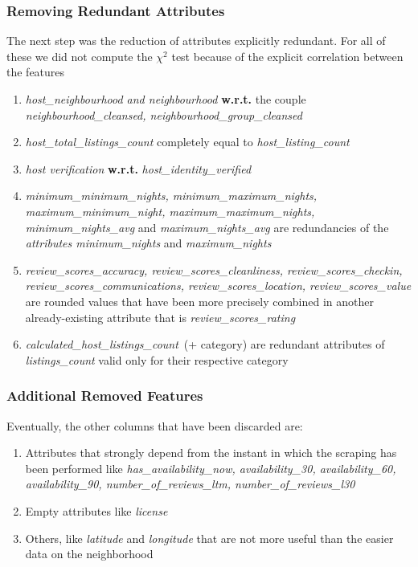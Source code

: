 \subsubsection{Removing Redundant Attributes}
The next step was the reduction of attributes explicitly redundant. For all of these we did not compute the $\chi^2$ test because of the explicit correlation between the features

\begin{enumerate}
	\item \textit{host\_neighbourhood and neighbourhood} \textbf{w.r.t.} the couple \textit{neighbourhood\_cleansed, neighbourhood\_group\_cleansed}
	\item \textit{host\_total\_listings\_count} completely equal to \textit{host\_listing\_count}
	\item \textit{host verification} \textbf{w.r.t.} \textit{host\_identity\_verified}
	\item \textit{minimum\_minimum\_nights, minimum\_maximum\_nights, maximum\_minimum\_night, maximum\_maximum\_nights, minimum\_nights\_avg} and \textit{maximum\_nights\_avg} are redundancies of the \textit{attributes minimum\_nights} and \textit{maximum\_nights}
	\item \textit{review\_scores\_accuracy, review\_scores\_cleanliness, review\_scores\_checkin, review\_scores\_communications, review\_scores\_location, review\_scores\_value} are rounded values that have been more precisely combined in another already-existing attribute that is \textit{review\_scores\_rating}
	\item \textit{calculated\_host\_listings\_count} (+ category) are redundant attributes of \textit{listings\_count} valid only for their respective category
\end{enumerate}

\subsubsection{Additional Removed Features}
Eventually, the other columns that have been discarded are:

\begin{enumerate}
	\item Attributes that strongly depend from the instant in which the scraping has been performed like \textit{has\_availability\_now, availability\_30, availability\_60, availability\_90, number\_of\_reviews\_ltm, number\_of\_reviews\_l30}
	\item Empty attributes like \textit{license}
	\item Others, like \textit{latitude} and \textit{longitude} that are not more useful than the easier data on the neighborhood
\end{enumerate}